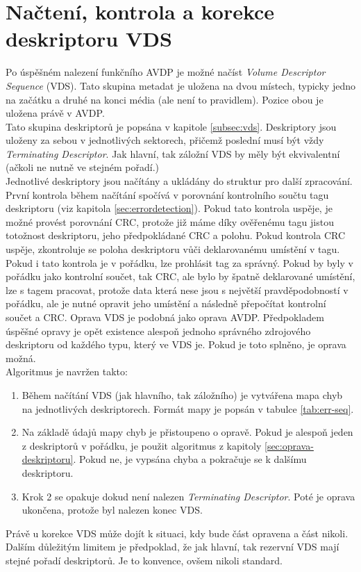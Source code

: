 \section{Načtení, kontrola a korekce deskriptoru VDS}
\label{sec:nacteni-a-oprava-vds}
Po úspěšném nalezení funkčního AVDP je možné načíst \textit{Volume Descriptor Sequence} (VDS). Tato skupina metadat je uložena na dvou místech, typicky jedno na začátku a druhé na konci média (ale není to pravidlem). Pozice obou je uložena právě v AVDP.\\
Tato skupina deskriptorů je popsána v kapitole \ref{subsec:vds}. Deskriptory jsou uloženy za sebou v jednotlivých sektorech, přičemž poslední musí být vždy \textit{Terminating Descriptor}. Jak hlavní, tak záložní VDS by měly být ekvivalentní (ačkoli ne nutně ve stejném pořadí.)\\
Jednotlivé deskriptory jsou načítány a ukládány do struktur pro další zpracování. První kontrola během načítání spočívá v porovnání kontrolního součtu tagu deskriptoru (viz kapitola \ref{sec:errordetection}). Pokud tato kontrola uspěje, je možné provést porovnání CRC, protože již máme díky ověřenému tagu jistou totožnost deskriptoru, jeho předpokládané CRC a polohu. Pokud kontrola CRC uspěje, zkontroluje se poloha deskriptoru vůči deklarovanému umístění v tagu. Pokud i tato kontrola je v pořádku, lze prohlásit tag za správný. Pokud by byly v pořádku jako kontrolní součet, tak CRC, ale bylo by špatně deklarované umístění, lze s tagem pracovat, protože data která nese jsou s největší pravděpodobností v pořádku, ale je nutné opravit jeho umístění a následně přepočítat kontrolní součet a CRC. 
Oprava VDS je podobná jako oprava AVDP. Předpokladem úspěšné opravy je opět existence alespoň jednoho správného zdrojového deskriptoru od každého typu, který ve VDS je. Pokud je toto splněno, je oprava možná.\\
Algoritmus je navržen takto:
\begin{enumerate}
    \item Během načítání VDS (jak hlavního, tak záložního) je vytvářena mapa chyb na jednotlivých deskriptorech. Formát mapy je popsán v tabulce \ref{tab:err-seq}. 
    \item Na základě údajů mapy chyb je přistoupeno o opravě. Pokud je alespoň jeden z deskriptorů v pořádku, je použit algoritmus z kapitoly \ref{sec:oprava-deskriptoru}. Pokud ne, je vypsána chyba a pokračuje se k dalšímu deskriptoru.
    \item Krok 2 se opakuje dokud není nalezen \textit{Terminating Descriptor}. Poté je oprava ukončena, protože byl nalezen konec VDS.
\end{enumerate}
Právě u korekce VDS může dojít k situaci, kdy bude část opravena a část nikoli. Dalším důležitým limitem je předpoklad, že jak hlavní, tak rezervní VDS mají stejné pořadí deskriptorů. Je to konvence, ovšem nikoli standard.

